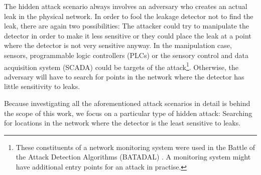 The hidden attack scenario always involves an adversary who creates an actual
leak in the physical network. In order to fool the leakage detector
 not to find the leak, there are again two possibilities: The attacker could
try to manipulate the detector in order to make it less sensitive or they
could place the leak at a point where the detector is not very sensitive
anyway.  In the manipulation case, sensors, programmable logic controllers
(PLCs) or the sensory control and data acquisition system (SCADA) could be
targets of the attack\footnote{These constituents of a network monitoring
system were used in the Battle of the Attack Detection Algorithms (BATADAL)
\cite{batadal}. A monitoring system might have additional entry points for an
attack in practise.}. Otherwise, the adversary will have to search for points
in the network where the detector has little sensitivity to leaks.

Because investigating all the aforementioned attack scenarios in detail is behind the scope of this work, we focus on a particular type of hidden attack: Searching for locations in the network where the detector is the least sensitive to leaks.
